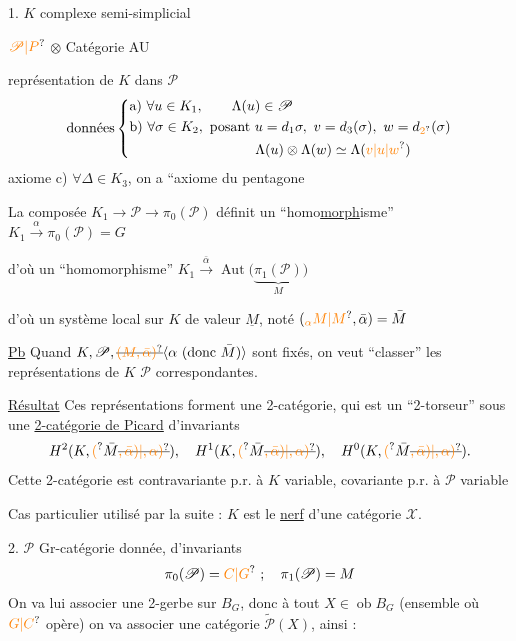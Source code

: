 1. $K$ complexe semi-simplicial

$\unsure{\mathscr P|P}$  $\otimes$ Catégorie AU

représentation \inserted{$\Lambda$} de $K$ dans $\mathscr P$
\[
\text{données}\left\{
\begin{aligned}
&\text{a) }\forall u\in K_1,\qquad\Lambda(u)\in\mathscr P\\
&\text{b) }\forall\sigma\in K_2,\ \text{posant }u=d_1\sigma,\ v=d_3(\sigma),\ w=d_{\unsure{2}}(\sigma)\\
&\hspace{9em}\Lambda(u)\otimes\Lambda(w)\simeq\Lambda(\unsure{v|u|w})
\end{aligned}\right.
\]
axiome \quad c) $\forall\Delta\in K_3$, on a ``axiome du pentagone

La composée \quad $K_1\longrightarrow\mathscr P\longrightarrow\pi_0(\mathscr P)$ définit un ``homo\uline{morph}isme'' \quad $K_1\xrightarrow{\alpha}\pi_0(\mathscr P)=G$

d'où un ``homomorphisme'' \quad $K_1\xrightarrow{\bar\alpha}\operatorname{Aut}\big(\underbrace{\pi_1(\mathscr P)}_{M}\big)$

d'où un système local sur $K$ de valeur $\underline M$, noté $(\unsure{{}_\alpha M|M},\bar\alpha)=\bar M$

\uline{Pb} Quand $K,\mathscr P,\deleted{\unsure{(M,\bar\alpha)}}\inserted{\alpha\ \text{(donc }\bar M\text{)}}$ sont fixés, on veut ``classer'' les représentations de $K$  $\mathscr P$ correspondantes.

\uline{Résultat} Ces représentations forment une 2-catégorie, qui est un ``2-torseur'' sous une \uline{2-catégorie de Picard}  d'invariants
\[
H^2(K,\unsure{(}\bar M\deleted{\unsure{,\bar\alpha)|,\alpha)}}),\quad
H^1(K,\unsure{(}\bar M\deleted{\unsure{,\bar\alpha)|,\alpha)}}),\quad
H^0(K,\unsure{(}\bar M\deleted{\unsure{,\bar\alpha)|,\alpha)}}).
\]
Cette 2-catégorie est contravariante p.r. à $K$ variable,  covariante p.r. à $\mathscr P$ variable

Cas particulier utilisé par la suite : $K$ est le \uline{nerf} d'une catégorie $\mathcal X$. 

2. $\mathscr P$ Gr-catégorie  donnée, d'invariants
\[
\pi_0(\mathscr P)=\unsure{C|G}\ ;\quad\pi_1(\mathscr P)=M
\]
On va lui associer une 2-gerbe  sur $B_G$, donc à tout $X\in\operatorname{ob}B_G$ (ensemble où $\unsure{G|C}$ opère) on va associer une catégorie $\widetilde{\mathscr P}(X)$, ainsi :


